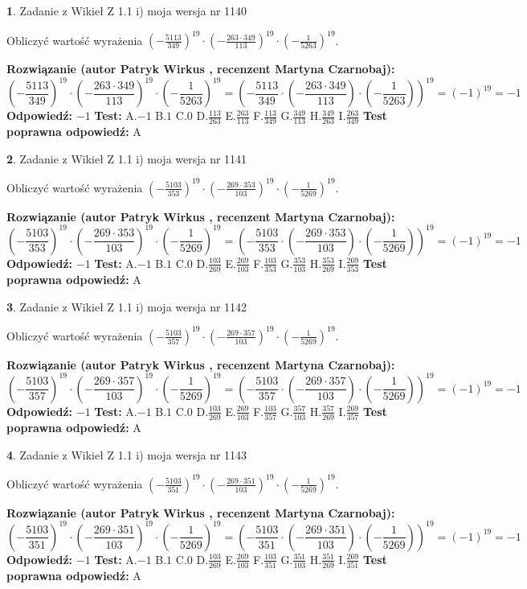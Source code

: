 \documentclass[12pt, a4paper]{article}
\theoremstyle{definition} %
\newtheorem{zad}{}
\newcommand{\zadStart}[1]{\begin{zad}#1\newline}
\newcommand{\zadStop}{\end{zad}}
\newcommand{\rozwStart}[2]{\noindent \textbf{Rozwiązanie (autor #1 , recenzent #2): }\newline}
\newcommand{\rozwStop}{\newline}
\newcommand{\odpStart}{\noindent \textbf{Odpowiedź:}\newline}
\newcommand{\odpStop}{\newline}
\newcommand{\testStart}{\noindent \textbf{Test:}\newline}
\newcommand{\testStop}{\newline}
\newcommand{\kluczStart}{\noindent \textbf{Test poprawna odpowiedź:}\newline}
\newcommand{\kluczStop}{\newline}
\begin{document}
\zadStart{Zadanie z Wikieł Z 1.1 i) moja wersja nr 1140}

Obliczyć wartość wyrażenia $(-\frac{5113}{349})^{19} \cdot (-\frac{263 \cdot 349}{113})^{19} \cdot (-\frac{1}{5263})^{19}$.
\zadStop
\rozwStart{Patryk Wirkus}{Martyna Czarnobaj}
$$(-\frac{5113}{349})^{19} \cdot (-\frac{263 \cdot 349}{113})^{19} \cdot (-\frac{1}{5263})^{19} = (-\frac{5113}{349} \cdot (-\frac{263 \cdot 349}{113}) \cdot (-\frac{1}{5263}))^{19} = (-1)^{19} = -1$$
\rozwStop
\odpStart
$-1$
\odpStop
\testStart
A.$-1$ B.$1$ C.$0$ D.$\frac{113}{263}$ E.$\frac{263}{113}$
F.$\frac{113}{349}$ G.$\frac{349}{113}$
H.$\frac{349}{263}$
I.$\frac{263}{349}$
\testStop
\kluczStart
A
\kluczStop



\zadStart{Zadanie z Wikieł Z 1.1 i) moja wersja nr 1141}

Obliczyć wartość wyrażenia $(-\frac{5103}{353})^{19} \cdot (-\frac{269 \cdot 353}{103})^{19} \cdot (-\frac{1}{5269})^{19}$.
\zadStop
\rozwStart{Patryk Wirkus}{Martyna Czarnobaj}
$$(-\frac{5103}{353})^{19} \cdot (-\frac{269 \cdot 353}{103})^{19} \cdot (-\frac{1}{5269})^{19} = (-\frac{5103}{353} \cdot (-\frac{269 \cdot 353}{103}) \cdot (-\frac{1}{5269}))^{19} = (-1)^{19} = -1$$
\rozwStop
\odpStart
$-1$
\odpStop
\testStart
A.$-1$ B.$1$ C.$0$ D.$\frac{103}{269}$ E.$\frac{269}{103}$
F.$\frac{103}{353}$ G.$\frac{353}{103}$
H.$\frac{353}{269}$
I.$\frac{269}{353}$
\testStop
\kluczStart
A
\kluczStop



\zadStart{Zadanie z Wikieł Z 1.1 i) moja wersja nr 1142}

Obliczyć wartość wyrażenia $(-\frac{5103}{357})^{19} \cdot (-\frac{269 \cdot 357}{103})^{19} \cdot (-\frac{1}{5269})^{19}$.
\zadStop
\rozwStart{Patryk Wirkus}{Martyna Czarnobaj}
$$(-\frac{5103}{357})^{19} \cdot (-\frac{269 \cdot 357}{103})^{19} \cdot (-\frac{1}{5269})^{19} = (-\frac{5103}{357} \cdot (-\frac{269 \cdot 357}{103}) \cdot (-\frac{1}{5269}))^{19} = (-1)^{19} = -1$$
\rozwStop
\odpStart
$-1$
\odpStop
\testStart
A.$-1$ B.$1$ C.$0$ D.$\frac{103}{269}$ E.$\frac{269}{103}$
F.$\frac{103}{357}$ G.$\frac{357}{103}$
H.$\frac{357}{269}$
I.$\frac{269}{357}$
\testStop
\kluczStart
A
\kluczStop



\zadStart{Zadanie z Wikieł Z 1.1 i) moja wersja nr 1143}

Obliczyć wartość wyrażenia $(-\frac{5103}{351})^{19} \cdot (-\frac{269 \cdot 351}{103})^{19} \cdot (-\frac{1}{5269})^{19}$.
\zadStop
\rozwStart{Patryk Wirkus}{Martyna Czarnobaj}
$$(-\frac{5103}{351})^{19} \cdot (-\frac{269 \cdot 351}{103})^{19} \cdot (-\frac{1}{5269})^{19} = (-\frac{5103}{351} \cdot (-\frac{269 \cdot 351}{103}) \cdot (-\frac{1}{5269}))^{19} = (-1)^{19} = -1$$
\rozwStop
\odpStart
$-1$
\odpStop
\testStart
A.$-1$ B.$1$ C.$0$ D.$\frac{103}{269}$ E.$\frac{269}{103}$
F.$\frac{103}{351}$ G.$\frac{351}{103}$
H.$\frac{351}{269}$
I.$\frac{269}{351}$
\testStop
\kluczStart
A
\kluczStop
\end{document}

